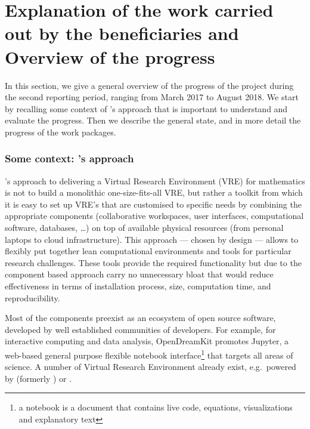 \section{Explanation of the work carried out by the beneficiaries and Overview of the progress}

In this section, we give a general overview of the progress of the
project during the second reporting period, ranging from March 2017 to
August 2018. We start by recalling some context of \ODK's approach
that is important to understand and evaluate the progress. Then we
describe the general state, and in more detail the progress of the
work packages.

\subsubsection*{Some context: \ODK's approach}
\ODK's approach to delivering a Virtual Research Environment (VRE) for
mathematics is not to build a monolithic one-size-fits-all VRE, but
rather a toolkit from which it is easy to set up VRE's that are
customised to specific needs by combining the appropriate components
(collaborative workspaces, user interfaces, computational software,
databases, \dots) on top of available physical resources (from
personal laptops to cloud infrastructure). This approach --- chosen by
design --- allows to flexibly put together lean computational
environments and tools for particular research challenges. These tools
provide the required functionality but due to the component based
approach carry no unnecessary bloat that would reduce effectiveness in
terms of installation process, size, computation time, and
reproducibility.

Most of the components preexist as an ecosystem of open source
software, developed by well established communities of developers. For
example, for interactive computing and data analysis, OpenDreamKit
promotes Jupyter, a web-based general purpose flexible notebook
interface\footnote{a notebook is a document that contains live code,
  equations, visualizations and explanatory text} that targets all
areas of science. A number of Virtual Research Environment already
exist, e.g.\ powered by \cocalc (formerly \SMC) or \JupyterHub.

